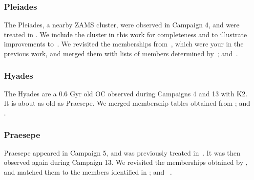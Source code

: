 \documentclass{aa}
\begin{document}
\subsubsection{Pleiades}
The Pleiades, a nearby ZAMS cluster, were observed in Campaign 4, and were treated in . We include the cluster in this work for completeness and to illustrate improvements to~. We revisited the memberships from~\citet{rebull_rotation_2016}, which were your in the previous work, and merged them with lists of members determined by~\citet{olivares_pleiades_2018, gaia_dr2_2018_hrd}; and~\citet{cantat_gaudin_2018}.
\subsubsection{Hyades}
The Hyades are a 0.6 Gyr old OC observed during Campaigns 4 and 13 with K2. It is about as old as Praesepe. We merged membership tables obtained from \citet{douglas_praesepe_hyades_2014, reino_hyades_2018}; and \citet{gaia_dr2_2018_hrd}.
\subsubsection{Praesepe}
Praesepe appeared in Campaign 5, and was previously treated in~. It was then observed again during Campaign 13. We revisited the memberships obtained by \citet{douglas_praesepe_hyades_2014}, and matched them to the members identified in \citet{douglas_poking_2017, rebull_praesepe_2017,cantat_gaudin_2018}; and ~\citet{gaia_dr2_2018_hrd}.
\end{document}
